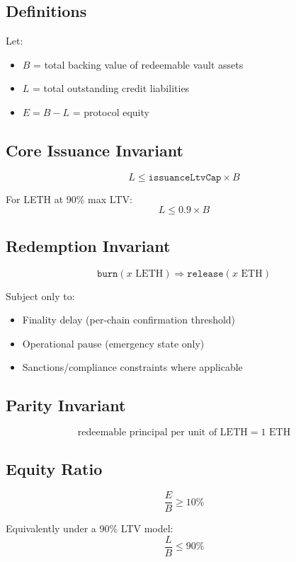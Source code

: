\documentclass[11pt,a4paper]{article}
\begin{document}
\subsection{Definitions}

Let:
\begin{itemize}[leftmargin=2em]
\item $B$ = total backing value of redeemable vault assets
\item $L$ = total outstanding credit liabilities
\item $E = B - L$ = protocol equity
\end{itemize}

\subsection{Core Issuance Invariant}

$$L \leq \texttt{issuanceLtvCap} \times B$$

For LETH at 90\% max LTV:
$$L \leq 0.9 \times B$$

\subsection{Redemption Invariant}

$$\texttt{burn}(x \text{ LETH}) \Rightarrow \texttt{release}(x \text{ ETH})$$

Subject only to:
\begin{itemize}[leftmargin=2em]
\item Finality delay (per-chain confirmation threshold)
\item Operational pause (emergency state only)
\item Sanctions/compliance constraints where applicable
\end{itemize}

\subsection{Parity Invariant}

$$\text{redeemable principal per unit of LETH} = 1 \text{ ETH}$$

\subsection{Equity Ratio}

$$\frac{E}{B} \geq 10\%$$

Equivalently under a 90\% LTV model:
$$\frac{L}{B} \leq 90\%$$
\end{document}
